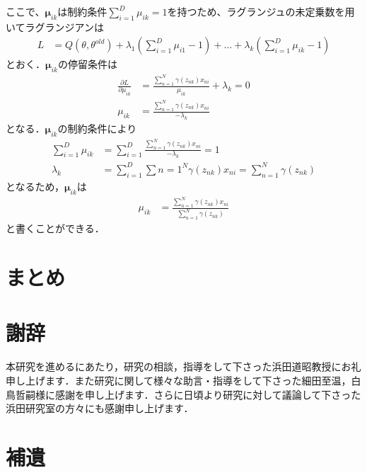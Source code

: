 \documentclass[dvipdfmx,autodetect-engine]{jsreport}
\begin{document}
ここで、$\bm{\mu}_{ik}$は制約条件$\sum_{i=1}^{D}\mu_{ik}=1$を持つため、ラグランジュの未定乗数を用いてラグランジアンは
\begin{align}
    L &= Q(\theta, \theta^{old}) + \lambda_1(\sum_{i=1}^{D} \mu_{i1} - 1) + \dots + \lambda_{k} ( \sum_{i=1}^{D} \mu_{ik} - 1 )
\end{align}
とおく．$\bm{\mu}_{ik}$の停留条件は
\begin{align}
    \frac{\partial L}{\partial \mu_{ik}} &= \frac{\sum_{n=1}^{N} \gamma(z_{nk}) x_{ni}}{\mu_{ik}} + \lambda_{k} = 0 \\
    \mu_{ik} &= \frac{\sum_{n=1}^{N} \gamma(z_{nk}) x_{ni}}{-\lambda_{k}}
\end{align}
となる．$\bm{\mu}_{ik}$の制約条件により
\begin{align}
    \sum_{i=1}^{D} \mu_{ik}&= \sum_{i=1}^{D} \frac{\sum_{n=1}^{N} \gamma(z_{nk}) x_{ni}}{-\lambda_{k}} = 1　\\
    \lambda_{k} &= \sum_{i=1}^{D} \sum{n=1}^{N} \gamma(z_{nk}) x_{ni} = \sum_{n=1}^{N} \gamma(z_{nk})
\end{align}
となるため，$\bm{\mu}_{ik}$は
\begin{align}
    \mu_{ik} &= \frac{\sum_{n=1}^{N} \gamma(z_{nk}) x_{ni}}{\sum_{n=1}^{N} \gamma(z_{nk})}
\end{align}
と書くことができる．

\chapter{まとめ}

\chapter*{謝辞}
本研究を進めるにあたり，研究の相談，指導をして下さった浜田道昭教授にお礼申し上げます．また研究に関して様々な助言・指導をして下さった細田至温，白鳥哲嗣様に感謝を申し上げます．さらに日頃より研究に対して議論して下さった浜田研究室の方々にも感謝申し上げます．






\clearpage

\appendix 

\chapter{補遺}
\end{document}
